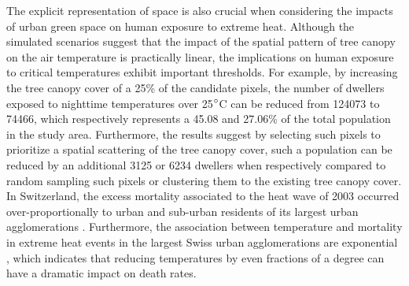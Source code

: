 \documentclass[10pt,letterpaper]{article}
\begin{document}
The explicit representation of space is also crucial when considering the impacts of urban green space on human exposure to extreme heat.
Although the simulated scenarios suggest that the impact of the spatial pattern of tree canopy on the air temperature is practically linear, the implications on human exposure to critical temperatures exhibit important thresholds.
For example, by increasing the tree canopy cover of a 25\% of the candidate pixels, the number of dwellers exposed to nighttime temperatures over 25$\degree$C can be reduced from 124073 to 74466, which respectively represents a 45.08 and 27.06\% of the total population in the study area.
Furthermore, the results suggest by selecting such pixels to prioritize a spatial scattering of the tree canopy cover, such a population can be reduced by an additional 3125 or 6234 dwellers when respectively compared to random sampling such pixels or clustering them to the existing tree canopy cover.
In Switzerland, the excess mortality associated to the heat wave of 2003 occurred over-proportionally to urban and sub-urban residents of its largest urban agglomerations \cite{grize2005heat}.
Furthermore, the association between temperature and mortality in extreme heat events in the largest Swiss urban agglomerations are exponential \cite{ragettli2017exploring}, which indicates that reducing temperatures by even fractions of a degree can have a dramatic impact on death rates.
\end{document}
